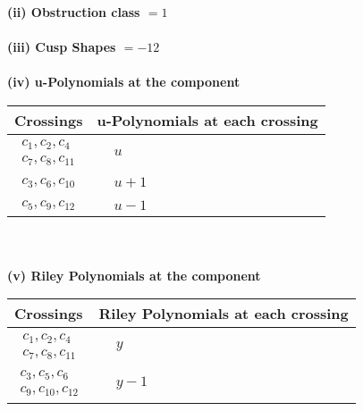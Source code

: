 \documentclass[1p]{elsarticle_modified}
\theoremstyle{definition}
\begin{document}
\flushleft \textbf{(ii) Obstruction class $= 1$}\\~\\
\flushleft \textbf{(iii) Cusp Shapes $= -12$}\\~\\
\newpage\renewcommand{\arraystretch}{1}
\flushleft \textbf{(iv) u-Polynomials at the component}\newline \\
\begin{tabular}{m{50pt}|m{274pt}}
Crossings & \hspace{64pt}u-Polynomials at each crossing \\
\hline $$\begin{aligned}c_{1},c_{2},c_{4}\\c_{7},c_{8},c_{11}\end{aligned}$$&$\begin{aligned}
&u
\end{aligned}$\\
\hline $$\begin{aligned}c_{3},c_{6},c_{10}\end{aligned}$$&$\begin{aligned}
&u+1
\end{aligned}$\\
\hline $$\begin{aligned}c_{5},c_{9},c_{12}\end{aligned}$$&$\begin{aligned}
&u-1
\end{aligned}$\\
\hline
\end{tabular}\\~\\
\newpage\renewcommand{\arraystretch}{1}
\flushleft \textbf{(v) Riley Polynomials at the component}\newline \\
\begin{tabular}{m{50pt}|m{274pt}}
Crossings & \hspace{64pt}Riley Polynomials at each crossing \\
\hline $$\begin{aligned}c_{1},c_{2},c_{4}\\c_{7},c_{8},c_{11}\end{aligned}$$&$\begin{aligned}
&y
\end{aligned}$\\
\hline $$\begin{aligned}c_{3},c_{5},c_{6}\\c_{9},c_{10},c_{12}\end{aligned}$$&$\begin{aligned}
&y-1
\end{aligned}$\\
\hline
\end{tabular}\\~\\
\end{document}
